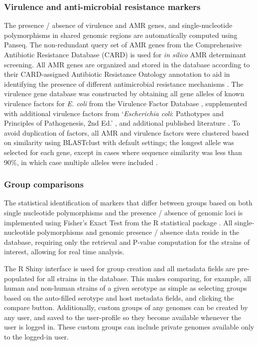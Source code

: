 \documentclass{bmcart}
\begin{document}
\subsubsection{Virulence and anti-microbial resistance markers}
The presence / absence of virulence and AMR genes, and single-nucleotide polymorphisms in shared genomic regions are automatically computed using Panseq. The non-redundant query set of AMR genes from the Comprehensive Antibiotic Resistance Database (CARD) \cite{mcarthur_comprehensive_2013} is used for \textit{in silico} AMR determinant screening. All AMR genes are organized and stored in the database according to their CARD-assigned Antibiotic Resistance Ontology annotation to aid in identifying the presence of different antimicrobial resistance mechanisms . The virulence gene database was constructed by obtaining all gene alleles of known virulence factors for \textit{E. coli} from the Virulence Factor Database \cite{chen_vfdb_2011}, supplemented with additional virulence factors from `\textit{Escherichia coli}: Pathotypes and Principles of Pathogenesis, 2nd Ed.' , and additional published literature \cite{donnenberg_escherichia_2013}. To avoid duplication of factors, all AMR and virulence factors were clustered based on similarity using BLASTclust with default settings; the longest allele was selected for each gene, except in cases where sequence similarity was less than 90\%, in which case multiple alleles were included \cite{altschul_gapped_1997}.

\subsubsection{Group comparisons}
The statistical identification of markers that differ between groups based on both single nucleotide polymorphisms and the presence / absence of genomic loci is implemented using Fisher’s Exact Test from the R statistical package \cite{r_foundation_for_statistical_computing_r:_2005}. All single-nucleotide polymorphisms and genomic presence / absence data reside in the database, requiring only the retrieval and P-value computation for the strains of interest, allowing for real time analysis.

The R Shiny interface is used for group creation and all metadata fields are pre-populated for all strains in the database. This makes comparing, for example, all human and non-human strains of a given serotype as simple as selecting groups based on the auto-filled serotype and host metadata fields, and clicking the compare button. Additionally, custom groups of any genomes can be created by any user, and saved to the user-profile so they become available whenever the user is logged in. These custom groups can include private genomes available only to the logged-in user.
\end{document}
